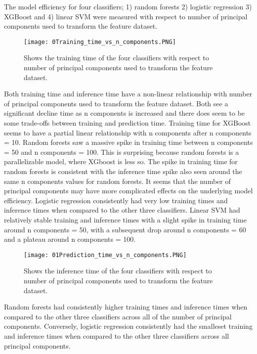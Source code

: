 \documentclass{article}
\begin{document}
\begin{itemize}
The model efficiency for four classifiers; 1) random forests 2) logistic regression 3) XGBoost and 4) linear SVM were measured with respect to number of principal components used to transform the feature dataset. 

\begin{figure}[hbt!]
\texttt{[image: 0Training\_time\_vs\_n\_components.PNG]}
\caption{Shows the training time of the four classifiers with respect to number of principal components used to transform the feature dataset.}
\end{figure}

Both training time and inference time have a non-linear relationship with number of principal components used to transform the feature dataset. Both see a significant decline time as n components is increased and there does seem to be some trade-offs between training and prediction time. Training time for XGBoost seems to have a partial linear relationship with n components after n components = 10. Random forests saw a massive spike in training time between n components = 50 and n components = 100. This is surprising because random forests is a parallelizable model, where XGboost is less so. The spike in training time for random forests is consistent with the inference time spike also seen around the same n components values for random forests. It seems that the number of principal components may have more complicated effects on the underlying model efficiency. Logistic regression consistently had very low training times and inference times when compared to the other three classifiers. Linear SVM had relatively stable training and inference times with a slight spike in training time around n components = 50, with a subsequent drop around n components = 60 and a plateau around n components = 100. 



\begin{figure}[hbt!]
\texttt{[image: 01Prediction\_time\_vs\_n\_components.PNG]}
\caption{Shows the inference time of the four classifiers with respect to number of principal components used to transform the feature dataset.}
\end{figure}

Random forests had consistently higher training times and inference times when compared to the other three classifiers across all of the number of principal components. Conversely, logistic regression consistently had the smalleset training and inference times when compared to the other three classifiers across all principal components. 


\end{itemize}
\end{document}
